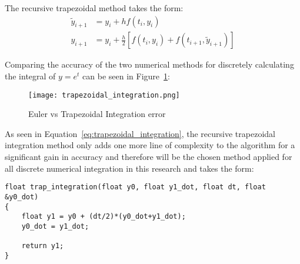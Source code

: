 The recursive trapezoidal method takes the form:
\begin{equation}\label{eq:trapezoidal_integration}
\begin{split}
\tilde{y}_{i+1}&=y_i+hf(t_i,y_i) \\
y_{i+1}&=y_i+\frac{h}{2}[f(t_i,y_i)+f(t_{i+1},\tilde{y}_{i+1})]
\end{split}
\end{equation}

Comparing the accuracy of the two numerical methods for discretely calculating the integral of $y=e^t$ can be seen in Figure~\ref{fig:trapezoidal_integration}:

\begin{figure}[h!]
 \centering
  \texttt{[image: trapezoidal\_integration.png]}
  \caption{Euler vs Trapezoidal Integration error}
  \label{fig:trapezoidal_integration}
\end{figure}

As seen in Equation~\ref{eq:trapezoidal_integration}, the recursive trapezoidal integration method only adds one more line of complexity to the algorithm for a significant gain in accuracy and therefore will be the chosen method applied for all discrete numerical integration in this research and takes the form: \newline

\begin{lstlisting}
float trap_integration(float y0, float y1_dot, float dt, float &y0_dot)
{
    float y1 = y0 + (dt/2)*(y0_dot+y1_dot);
    y0_dot = y1_dot;

    return y1;
}
\end{lstlisting}










